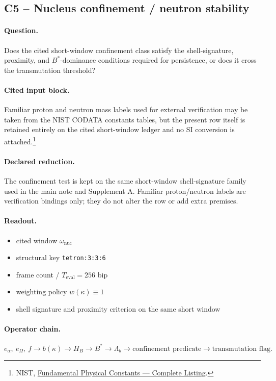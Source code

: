 \subsection{C5 -- Nucleus confinement / neutron stability}\label{app:c5}
\paragraph{Question.} Does the cited short-window confinement class satisfy the shell-signature, proximity, and $B^*$-dominance conditions required for persistence, or does it cross the transmutation threshold?

\paragraph{Cited input block.} Familiar proton and neutron mass labels used for external verification may be taken from the NIST CODATA constants tables, but the present row itself is retained entirely on the cited short-window ledger and no SI conversion is attached.\footnote{NIST, \href{https://physics.nist.gov/cuu/Constants/Table/allascii.txt}{Fundamental Physical Constants --- Complete Listing}.}

\paragraph{Declared reduction.} The confinement test is kept on the same short-window shell-signature family used in the main note and Supplement A. Familiar proton/neutron labels are verification bindings only; they do not alter the row or add extra premises.

\paragraph{Readout.}
\begin{itemize}
\item cited window $\omega_{\mathrm{nuc}}$
\item structural key \texttt{tetron:3:3:6}
\item frame count / $T_{\mathrm{eval}}=256$ bip
\item weighting policy $w(\kappa)\equiv 1$
\item shell signature and proximity criterion on the same short window
\end{itemize}

\paragraph{Operator chain.}
\[
e_\alpha,\ e_\Omega,\ f
\to
b(\kappa)
\to
H_B
\to
B^*
\to
\Lambda_b
\to
\text{confinement predicate}
\to
\text{transmutation flag}.
\]

